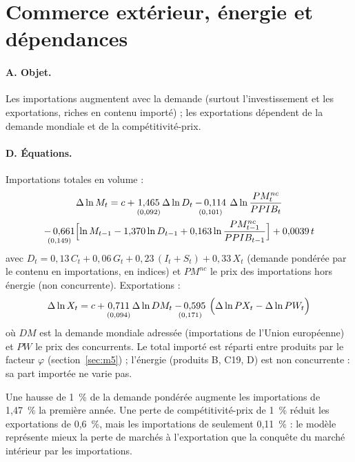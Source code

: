 \section{Commerce extérieur, énergie et dépendances}
\label{sec:commerce}

\paragraph{A. Objet.} Les importations augmentent avec la demande (surtout l'investissement et les exportations, riches
en contenu importé) ; les exportations dépendent de la demande mondiale et de la compétitivité-prix.

\paragraph{D. Équations.} Importations totales en volume :
\begin{multline}
\Delta\ln M_t = c + \underset{(0{,}092)}{1{,}465}\,\Delta\ln D_t \underset{(0{,}101)}{-\,0{,}114}\,\Delta\ln\frac{PM^{nc}_t}{PPIB_t} \\
\underset{(0{,}149)}{-\,0{,}661}\Bigl[\ln M_{t-1} - 1{,}370\ln D_{t-1} + 0{,}163\ln\frac{PM^{nc}_{t-1}}{PPIB_{t-1}}\Bigr] + 0{,}0039\,t
\end{multline}
avec $D_t = 0{,}13\,C_t + 0{,}06\,G_t + 0{,}23\,(I_t+S_t) + 0{,}33\,X_t$ (demande pondérée par le contenu en importations,
en indices) et $PM^{nc}$ le prix des importations hors énergie (non concurrente). Exportations :
\begin{equation}
\Delta\ln X_t = c + \underset{(0{,}094)}{0{,}711}\,\Delta\ln DM_t \underset{(0{,}171)}{-\,0{,}595}\,\Bigl(\Delta\ln PX_t - \Delta\ln PW_t\Bigr)
\end{equation}
où $DM$ est la demande mondiale adressée (importations de l'Union européenne) et $PW$ le prix des concurrents. Le total
importé est réparti entre produits par le facteur $\varphi$ (section~\ref{sec:m5}) ; l'énergie (produits B, C19, D)
est non concurrente : sa part importée ne varie pas.

\begin{exemple}
Une hausse de 1~\% de la demande pondérée augmente les importations de 1,47~\% la première année. Une perte de
compétitivité-prix de 1~\% réduit les exportations de 0,6~\%, mais les importations de seulement 0,11~\% : le modèle
représente mieux la perte de marchés à l'exportation que la conquête du marché intérieur par les importations.
\end{exemple}

